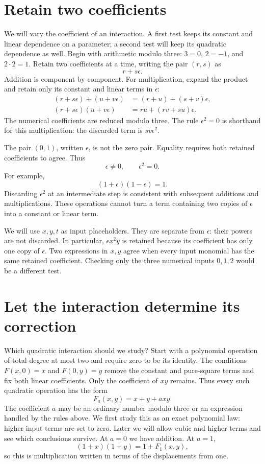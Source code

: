 \section{Retain two coefficients}\label{sec:parameter}

We will vary the coefficient of an interaction. A first test keeps its constant and linear dependence on a parameter; a second test will keep its quadratic dependence as well. Begin with arithmetic modulo three: \(3=0\), \(2=-1\), and \(2\cdot2=1\). Retain two coefficients at a time, writing the pair \((r,s)\) as
\[
 r+s\epsilon.
\]
Addition is component by component. For multiplication, expand the product and retain only its constant and linear terms in \(\epsilon\):
\begin{align}
 (r+s\epsilon)+(u+v\epsilon)&=(r+u)+(s+v)\epsilon,\\
 (r+s\epsilon)(u+v\epsilon)&=ru+(rv+su)\epsilon.
 \label{eq:two-coefficients}
\end{align}
The numerical coefficients are reduced modulo three. The rule \(\epsilon^2=0\) is shorthand for this multiplication: the discarded term is \(sv\epsilon^2\).

The pair \((0,1)\), written \(\epsilon\), is not the zero pair. Equality requires both retained coefficients to agree. Thus
\[
 \epsilon\ne0,\qquad \epsilon^2=0.
\]
For example,
\[
 (1+\epsilon)(1-\epsilon)=1.
\]
Discarding \(\epsilon^2\) at an intermediate step is consistent with subsequent additions and multiplications. These operations cannot turn a term containing two copies of \(\epsilon\) into a constant or linear term.

We will use \(x,y,t\) as input placeholders. They are separate from \(\epsilon\): their powers are not discarded. In particular, \(\epsilon x^2y\) is retained because its coefficient has only one copy of \(\epsilon\). Two expressions in \(x,y\) agree when every input monomial has the same retained coefficient. Checking only the three numerical inputs \(0,1,2\) would be a different test.

\section{Let the interaction determine its correction}\label{sec:repair}

Which quadratic interaction should we study? Start with a polynomial operation of total degree at most two and require zero to be its identity. The conditions \(F(x,0)=x\) and \(F(0,y)=y\) remove the constant and pure-square terms and fix both linear coefficients. Only the coefficient of \(xy\) remains. Thus every such quadratic operation has the form
\begin{equation}\label{eq:family}
 F_a(x,y)=x+y+a xy.
\end{equation}
The coefficient \(a\) may be an ordinary number modulo three or an expression handled by the rules above. We first study this as an exact polynomial law: higher input terms are set to zero. Later we will allow cubic and higher terms and see which conclusions survive. At \(a=0\) we have addition. At \(a=1\),
\[
 (1+x)(1+y)=1+F_1(x,y),
\]
so this is multiplication written in terms of the displacements from one.

